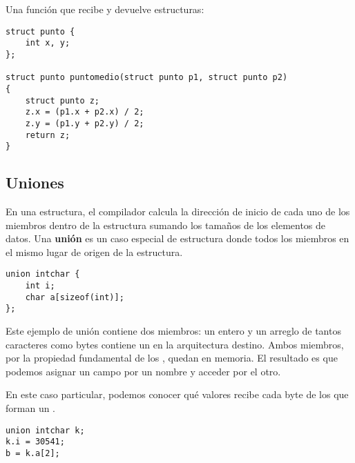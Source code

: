 \begin{ejemplo}
Una función que recibe y devuelve estructuras:
\begin{lstlisting}
struct punto {
    int x, y;
};

struct punto puntomedio(struct punto p1, struct punto p2)
{
    struct punto z;
    z.x = (p1.x + p2.x) / 2;
    z.y = (p1.y + p2.y) / 2;
    return z;
}
\end{lstlisting}
\end{ejemplo}

\subsection{Uniones}
En una estructura, el compilador calcula la dirección de inicio de cada uno de
los miembros dentro de la estructura sumando los tamaños de los elementos de
datos. Una \textbf{unión} es un caso especial de estructura donde todos los miembros
 en el mismo lugar de origen de la estructura.
\begin{lstlisting}
union intchar {
    int i;
    char a[sizeof(int)];
};
\end{lstlisting}
Este ejemplo de unión contiene dos miembros: un entero y un arreglo de tantos
caracteres como bytes contiene un  en la arquitectura destino. Ambos
miembros, por la propiedad fundamental de los , quedan  en
memoria. El resultado es que podemos asignar un campo por un nombre y acceder
por el otro. 
\begin{ejemplo}
En este caso particular, podemos conocer qué valores recibe cada
byte de los que forman un .
\begin{lstlisting}
union intchar k;
k.i = 30541;
b = k.a[2];
\end{lstlisting}
\end{ejemplo}

